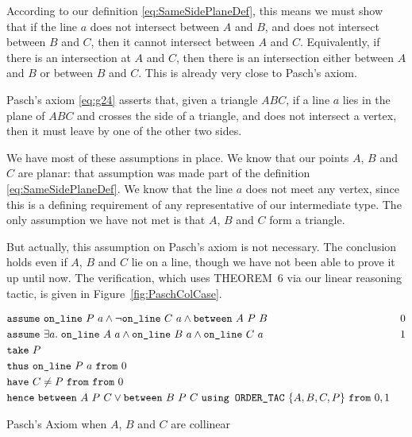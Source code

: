 According to our definition \eqref{eq:SameSidePlaneDef}, this means we must show that if the line $a$ does not intersect between $A$ and $B$, and does not intersect between $B$ and $C$, then it cannot intersect between $A$ and $C$. Equivalently, if there is an intersection at $A$ and $C$, then there is an intersection either between $A$ and $B$ or between $B$ and $C$. This is already very close to Pasch's axiom.

Pasch's axiom \eqref{eq:g24} asserts that, given a triangle $ABC$, if a line $a$ lies in the plane of $ABC$ and crosses the side of a triangle, and does not intersect a vertex, then it must leave by one of the other two sides. 

We have most of these assumptions in place. We know that our points $A$, $B$ and $C$ are planar: that assumption was made part of the definition \eqref{eq:SameSidePlaneDef}. We know that the line $a$ does not meet any vertex, since this is a defining requirement of any representative of our intermediate type. The only assumption we have not met is that $A$, $B$ and $C$ form a triangle.

But actually, this assumption on Pasch's axiom is not necessary. The conclusion holds even if $A$, $B$ and $C$ lie on a line, though we have not been able to prove it up until now. The verification, which uses THEOREM~6 via our linear reasoning tactic, is given in Figure~\ref{fig:PaschColCase}. 

\begin{boxedfigure}
  \begin{align*}
    & \code{assume}\ \code{on\_line}\ P\ a\wedge\neg\code{on\_line}\ C\ a \wedge \between{A}{P}{B} & 0\\
    & \code{assume}\ \exists a.\; \code{on\_line}\ A\ a\wedge\code{on\_line}\ B\ a\wedge\code{on\_line}\ C\ a&1\\
    & \code{take}\ P\\
    & \code{thus}\ \code{on\_line}\ P\ a\ \code{from}\ 0\\
    & \code{have}\ C \neq P\ \code{from}\ \code{from}\ 0\\
    & \code{hence}\ \between{A}{P}{C} \vee \between{B}{P}{C}\ \code{using ORDER\_TAC}\ \{A,B,C,P\}\ \code{from}\ 0,1
  \end{align*}
  \caption{Pasch's Axiom when $A$, $B$ and $C$ are collinear}
  \label{fig:PaschColCase}
\end{boxedfigure}

